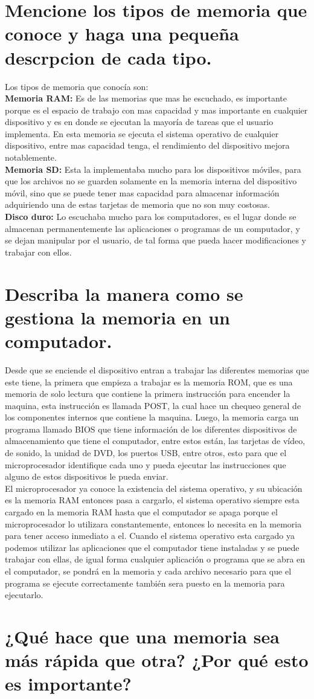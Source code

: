 \documentclass{article}
\begin{document}
\section{Mencione los tipos de memoria que conoce y haga una pequeña descrpcion de cada tipo.} \label{contenido}
        \Large
        Los tipos de memoria que conocía son:\\
       \textbf{Memoria RAM:}
       Es de las memorias que mas he escuchado, es importante porque es el espacio de trabajo con mas capacidad y mas importante en cualquier dispositivo y es en donde se ejecutan la mayoría de tareas que el usuario implementa.
       En esta memoria se ejecuta el sistema operativo de cualquier dispositivo, entre mas capacidad tenga, el rendimiento del dispositivo mejora notablemente.\\
       \textbf{Memoria SD:}
       Esta la implementaba mucho para los dispositivos móviles, para que los archivos no se guarden solamente en la memoria interna del dispositivo móvil, sino que se puede tener mas capacidad para almacenar información adquiriendo una de estas tarjetas de memoria que no son muy costosas.\\
       \textbf{Disco duro:}
       Lo escuchaba mucho para los computadores, es el lugar donde se almacenan permanentemente las aplicaciones o programas de un computador, y se dejan manipular por el usuario, de tal forma que pueda hacer modificaciones y trabajar con ellos.
\section{Describa la manera como se gestiona la memoria en un computador.} \label{contenido}
        \Large
        Desde que se enciende el dispositivo entran a trabajar las diferentes memorias que este tiene, la primera que empieza a trabajar es la memoria ROM, que es una memoria de solo lectura que contiene la primera instrucción para encender la maquina, esta instrucción es llamada POST, la cual hace un chequeo general de los componentes internos que contiene la maquina.
        Luego, la memoria carga un programa llamado BIOS que tiene información de los diferentes dispositivos de almacenamiento que tiene el computador, entre estos están, las tarjetas de vídeo, de sonido, la unidad de DVD, los puertos USB, entre otros, esto para que el microprocesador identifique cada uno y pueda ejecutar las instrucciones que alguno de estos dispositivos le pueda enviar.\\
        El microprocesador ya conoce la existencia del sistema operativo, y su ubicación es la memoria RAM entonces pasa a cargarlo, el sistema operativo siempre esta cargado en la memoria RAM hasta que el computador se apaga porque el microprocesador lo utilizara constantemente, entonces lo necesita en la memoria para tener acceso inmediato a el.
        Cuando el sistema operativo esta cargado ya podemos utilizar las aplicaciones que el computador tiene instaladas y se puede trabajar con ellas, de igual forma cualquier aplicación o programa que se abra en el computador, se pondrá en la memoria y cada archivo necesario para que el programa se ejecute correctamente también sera puesto en la memoria para ejecutarlo.

\section{¿Qué hace que una memoria sea más rápida que otra? ¿Por qué esto es importante?} \label{contenido}
        \Large
\end{document}
